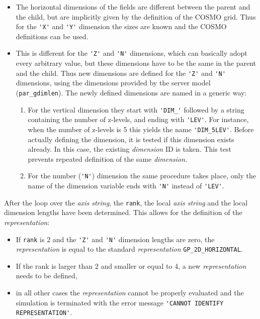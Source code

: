 \documentclass[11pt,twoside]{article}
\begin{document}
\begin{itemize}
\begin{enumerate}
\begin{itemize}
\begin{itemize}
\begin{itemize}%
\item The horizontal dimensions of the fields are different between the parent 
and the 
child, but are implicitly given by the definition of the COSMO grid. 
Thus for the \verb|'X'| and \verb|'Y'| dimension the sizes are known and the 
 COSMO definitions can be used. 

\item This is different for the \verb|'Z'| and
\verb|'N'| dimensions, which can basically adopt every arbitrary value, but
these dimensions have to be the same in the parent and the child. 
Thus new dimensions are defined for the \verb|'Z'| and \verb|'N'|
dimensions, using the dimensions provided by the server model 
(\verb|par_gdimlen|). 
The newly defined dimensions are named in a generic way:  
\begin{enumerate}%
\item For the vertical dimension they start with \verb|'DIM_'| followed
by a string containing the number of z-levels, and ending with \verb|'LEV'|.
For instance, when the number of z-levels is 5 this yields the name 
\verb|'DIM_5LEV'|. Before actually defining the dimension, it is tested 
if this dimension exists already.
In this case, the existing {\it dimension} ID is taken. 
This test prevents repeated
definition of the same {\it dimension}. 
\item 
For the number (\verb|'N'|) dimension the same procedure takes place,
only the name of the dimension variable ends with \verb|'N'| instead of 
\verb|'LEV'|.
\end{enumerate}%
\end{itemize}%

After the loop over the {\it axis string}, the \verb|rank|, the local {\it axis 
string} and the local dimension lengths have been determined. This allows for
the definition of the {\it representation}:
\begin{itemize}%
\item If \verb|rank| is 2 and the \verb|'Z'| and \verb|'N'| dimension lengths are
 zero, the {\it representation} is equal to the standard {\it representation} 
\verb|GP_2D_HORIZONTAL|. 
\item If the rank is larger than 2 and smaller or equal to 4,
a new {\it representation} needs to be defined, 
\item in all other cases the {\it representation}
cannot be properly evaluated and the simulation is terminated with the error
message \verb|'CANNOT IDENTIFY REPRESENTATION'|.
\end{itemize}%


\end{itemize}
\end{itemize}
\end{enumerate}
\end{itemize}
\end{document}
